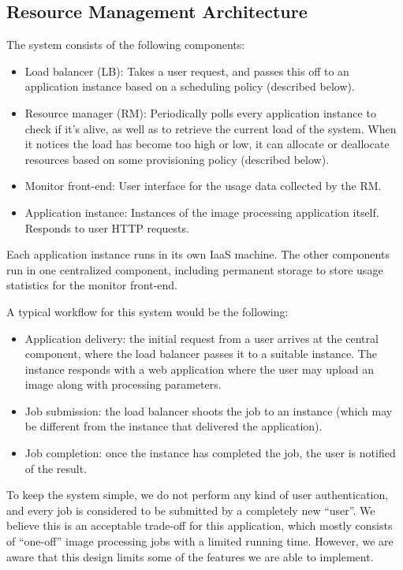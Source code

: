 \documentclass[conference]{IEEEtran}
\begin{document}
\subsection{Resource Management Architecture}

The system consists of the following components:

\begin{itemize}
  \item Load balancer (LB): Takes a user request, and passes this off to an application instance based on a scheduling policy (described below).
  \item Resource manager (RM): Periodically polls every application instance to check if it's alive, as well as to retrieve the current load of the system. When it notices the load has become too high or low, it can allocate or deallocate resources based on some provisioning policy (described below).
  \item Monitor front-end: User interface for the usage data collected by the RM.
  \item Application instance: Instances of the image processing application itself. Responds to user HTTP requests.
\end{itemize}

Each application instance runs in its own IaaS machine. The other components run in one centralized component, including permanent storage to store usage statistics for the monitor front-end.

A typical workflow for this system would be the following:

\begin{itemize}
  \item Application delivery: the initial request from a user arrives at the central component, where the load balancer passes it to a suitable instance. The instance responds with a web application where the user may upload an image along with processing parameters.
  \item Job submission: the load balancer shoots the job to an instance (which may be different from the instance that delivered the application).
  \item Job completion: once the instance has completed the job, the user is notified of the result.
\end{itemize}

To keep the system simple, we do not perform any kind of user authentication, and every job is considered to be submitted by a completely new ``user''. We believe this is an acceptable trade-off for this application, which mostly consists of ``one-off'' image processing jobs with a limited running time. However, we are aware that this design limits some of the features we are able to implement.
\end{document}
